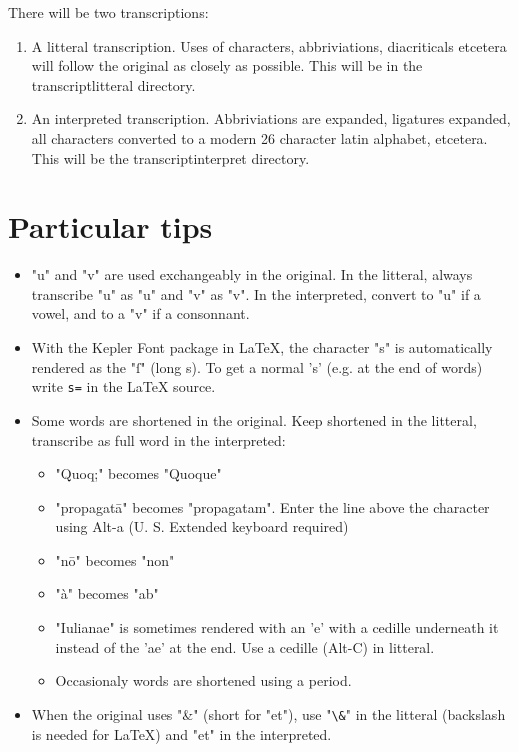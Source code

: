 \documentclass{report}
\begin{document}
There will be two transcriptions:
\begin{enumerate}
\item A litteral transcription. Uses of characters, abbriviations, diacriticals
 etcetera will follow the original as closely as possible. This will be in the
 transcriptlitteral directory.
\item An interpreted transcription. Abbriviations are expanded, ligatures
 expanded, all characters converted to a modern 26 character latin alphabet,
 etcetera. This will be the transcriptinterpret directory.
\end{enumerate}

\section{Particular tips}
\begin{itemize}
\item "u" and "v" are used exchangeably in the original. In the litteral,
 always transcribe "u" as "u" and "v" as "v". In the interpreted,
 convert to "u" if a vowel, and to a "v" if a consonnant.
\item With the Kepler Font package in LaTeX, the character "s" is automatically
 rendered as the "ſ" (long s). To get a normal 's' (e.g. at the end of words)
 write \verb"s=" in the LaTeX source.
\item Some words are shortened in the original.
 Keep shortened in the litteral, transcribe as full word in the interpreted:
\begin{itemize}
\item "Quoq;" becomes "Quoque"
\item "propagatā" becomes "propagatam". Enter the line above the character
 using Alt-a (U. S. Extended keyboard required)
\item "nō" becomes "non"
\item "à" becomes "ab"
\item "Iulianae" is sometimes rendered with an 'e' with a cedille underneath
 it instead of the 'ae' at the end. Use a cedille (Alt-C) in litteral.
\item Occasionaly words are shortened using a period.
\end{itemize}
\item When the original uses "\&" (short for "et"), use "\verb+\&+"
 in the litteral (backslash is needed for LaTeX) and "et" in the interpreted.
\end{itemize}
\end{document}
